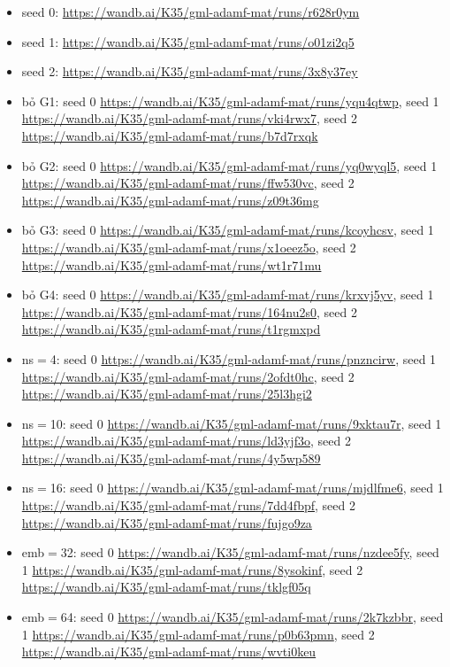 \begin{itemize}\itemsep0pt\parskip0pt
  \item seed 0: \url{https://wandb.ai/K35/gml-adamf-mat/runs/r628r0ym}
  \item seed 1: \url{https://wandb.ai/K35/gml-adamf-mat/runs/o01zi2q5}
  \item seed 2: \url{https://wandb.ai/K35/gml-adamf-mat/runs/3x8y37ey}
  \item bỏ G1: seed 0 \url{https://wandb.ai/K35/gml-adamf-mat/runs/yqu4qtwp}, seed 1 \url{https://wandb.ai/K35/gml-adamf-mat/runs/vki4rwx7}, seed 2 \url{https://wandb.ai/K35/gml-adamf-mat/runs/b7d7rxqk}
  \item bỏ G2: seed 0 \url{https://wandb.ai/K35/gml-adamf-mat/runs/yq0wyql5}, seed 1 \url{https://wandb.ai/K35/gml-adamf-mat/runs/ffw530vc}, seed 2 \url{https://wandb.ai/K35/gml-adamf-mat/runs/z09t36mg}
  \item bỏ G3: seed 0 \url{https://wandb.ai/K35/gml-adamf-mat/runs/kcoyhcsv}, seed 1 \url{https://wandb.ai/K35/gml-adamf-mat/runs/x1oeez5o}, seed 2 \url{https://wandb.ai/K35/gml-adamf-mat/runs/wt1r71mu}
  \item bỏ G4: seed 0 \url{https://wandb.ai/K35/gml-adamf-mat/runs/krxvj5yv}, seed 1 \url{https://wandb.ai/K35/gml-adamf-mat/runs/164nu2s0}, seed 2 \url{https://wandb.ai/K35/gml-adamf-mat/runs/t1rgmxpd}
  \item ns$=$4: seed 0 \url{https://wandb.ai/K35/gml-adamf-mat/runs/pnzncirw}, seed 1 \url{https://wandb.ai/K35/gml-adamf-mat/runs/2ofdt0hc}, seed 2 \url{https://wandb.ai/K35/gml-adamf-mat/runs/25l3hgi2}
  \item ns$=$10: seed 0 \url{https://wandb.ai/K35/gml-adamf-mat/runs/9xktau7r}, seed 1 \url{https://wandb.ai/K35/gml-adamf-mat/runs/ld3yjf3o}, seed 2 \url{https://wandb.ai/K35/gml-adamf-mat/runs/4y5wp589}
  \item ns$=$16: seed 0 \url{https://wandb.ai/K35/gml-adamf-mat/runs/mjdlfme6}, seed 1 \url{https://wandb.ai/K35/gml-adamf-mat/runs/7dd4fbpf}, seed 2 \url{https://wandb.ai/K35/gml-adamf-mat/runs/fujgo9za}
  \item emb$=$32: seed 0 \url{https://wandb.ai/K35/gml-adamf-mat/runs/nzdee5fy}, seed 1 \url{https://wandb.ai/K35/gml-adamf-mat/runs/8ysokinf}, seed 2 \url{https://wandb.ai/K35/gml-adamf-mat/runs/tklgf05q}
  \item emb$=$64: seed 0 \url{https://wandb.ai/K35/gml-adamf-mat/runs/2k7kzbbr}, seed 1 \url{https://wandb.ai/K35/gml-adamf-mat/runs/p0b63pmn}, seed 2 \url{https://wandb.ai/K35/gml-adamf-mat/runs/wvti0keu}

\end{itemize}
